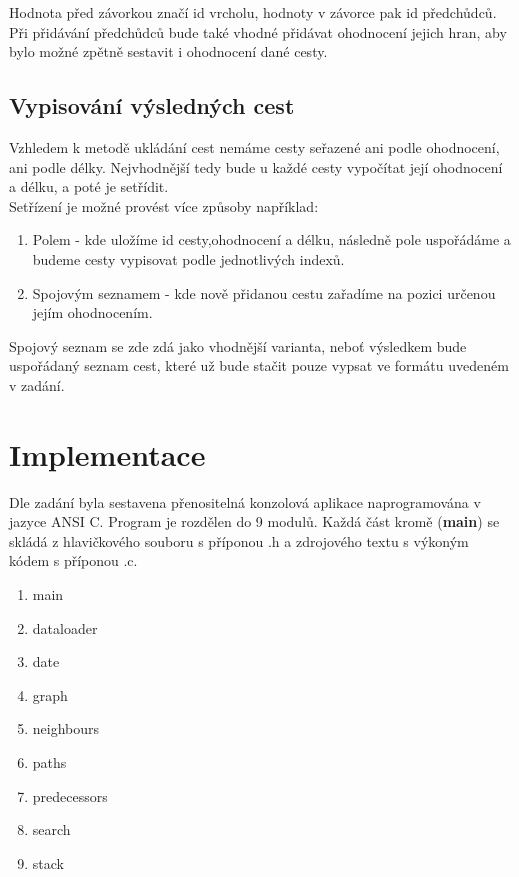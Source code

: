   Hodnota před závorkou značí id vrcholu, hodnoty v závorce pak id předchůdců.
  Při přidávání předchůdců bude také vhodné přidávat ohodnocení jejich hran, aby bylo možné zpětně sestavit i ohodnocení dané cesty.
  
  \section{Vypisování výsledných cest}
  Vzhledem k metodě ukládání cest nemáme cesty seřazené ani podle ohodnocení, ani podle délky. Nejvhodnější tedy bude u každé cesty vypočítat její ohodnocení a délku, a poté je setřídit.\\
  
  Setřízení je možné provést více způsoby například:
  
  \begin{enumerate}
  	\item Polem - kde uložíme id cesty,ohodnocení a délku, následně pole uspořádáme a budeme cesty vypisovat podle jednotlivých indexů.
  	\item Spojovým seznamem - kde nově přidanou cestu zařadíme na pozici určenou jejím ohodnocením.
  \end{enumerate}

	Spojový seznam se zde zdá jako vhodnější varianta, neboť výsledkem bude uspořádaný seznam cest, které už bude stačit pouze vypsat ve formátu uvedeném v zadání.

\chapter{Implementace}
Dle zadání byla sestavena přenositelná konzolová aplikace naprogramována v jazyce ANSI C. Program je rozdělen do 9 modulů. Každá část kromě (\textbf{main}) se skládá z hlavičkového souboru s příponou .h a zdrojového textu s výkoným kódem s příponou .c.

\begin{enumerate}
	\item main
	\item dataloader
	\item date
	\item graph
	\item neighbours
	\item paths
	\item predecessors
	\item search
	\item stack
\end{enumerate}

